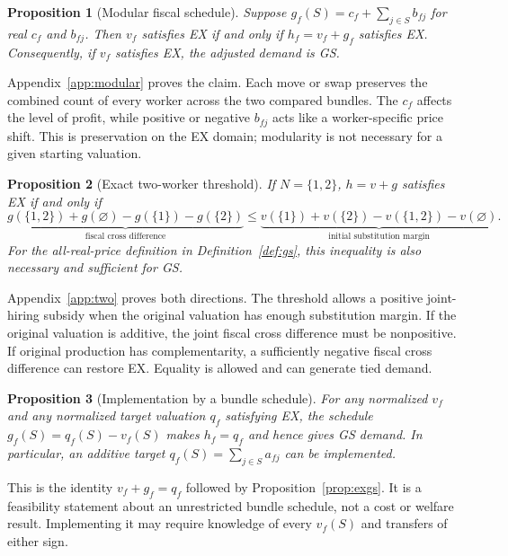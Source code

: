 \documentclass[11pt]{article}
\newtheorem{proposition}{Proposition}
\theoremstyle{definition}
\theoremstyle{remark}
\numberwithin{equation}{section}
\begin{document}
\begin{proposition}[Modular fiscal schedule]\label{prop:modular}
Suppose $g_f(S)=c_f+\sum_{j\in S}b_{fj}$ for real $c_f$ and $b_{fj}$. Then $v_f$ satisfies EX if and only if $h_f=v_f+g_f$ satisfies EX. Consequently, if $v_f$ satisfies EX, the adjusted demand is GS.
\end{proposition}
\noindent Appendix~\ref{app:modular} proves the claim. Each move or swap preserves the combined count of every worker across the two compared bundles. The $c_f$ affects the level of profit, while positive or negative $b_{fj}$ acts like a worker-specific price shift. This is preservation on the EX domain; modularity is not necessary for a given starting valuation.

\begin{proposition}[Exact two-worker threshold]\label{prop:two}
If $N=\{1,2\}$, $h=v+g$ satisfies EX if and only if
\begin{equation}
\underbrace{g(\{1,2\})+g(\varnothing)-g(\{1\})-g(\{2\})}_{\text{fiscal cross difference}}
\le
\underbrace{v(\{1\})+v(\{2\})-v(\{1,2\})-v(\varnothing)}_{\text{initial substitution margin}} .
\label{eq:threshold}
\end{equation}
For the all-real-price definition in Definition~\ref{def:gs}, this inequality is also necessary and sufficient for GS.
\end{proposition}
\noindent Appendix~\ref{app:two} proves both directions. The threshold allows a positive joint-hiring subsidy when the original valuation has enough substitution margin. If the original valuation is additive, the joint fiscal cross difference must be nonpositive. If original production has complementarity, a sufficiently negative fiscal cross difference can restore EX. Equality is allowed and can generate tied demand.

\begin{proposition}[Implementation by a bundle schedule]\label{prop:implement}
For any normalized $v_f$ and any normalized target valuation $q_f$ satisfying EX, the schedule $g_f(S)=q_f(S)-v_f(S)$ makes $h_f=q_f$ and hence gives GS demand. In particular, an additive target $q_f(S)=\sum_{j\in S}a_{fj}$ can be implemented.
\end{proposition}
\noindent This is the identity $v_f+g_f=q_f$ followed by Proposition~\ref{prop:exgs}. It is a feasibility statement about an unrestricted bundle schedule, not a cost or welfare result. Implementing it may require knowledge of every $v_f(S)$ and transfers of either sign.
\end{document}
